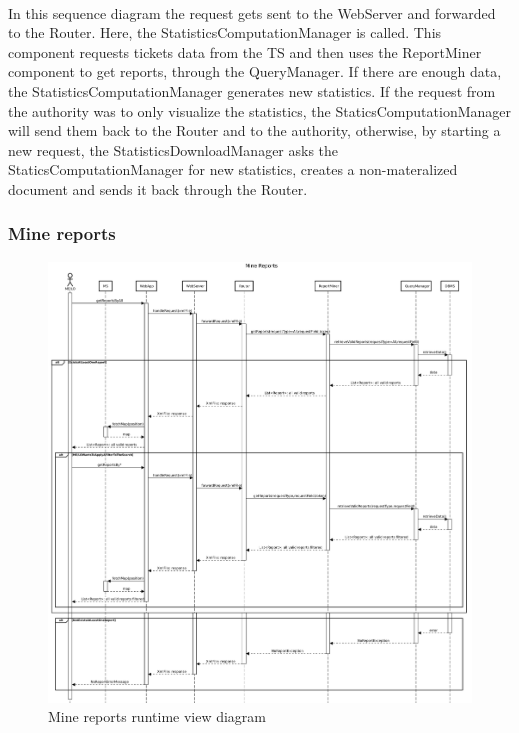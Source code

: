 					\paragraph{}
						In this sequence diagram the request gets sent to the WebServer and forwarded to the Router. Here, the StatisticsComputationManager is called. This component requests tickets data from the TS and then uses the ReportMiner component to get reports, through the QueryManager. If there are enough data, the StatisticsComputationManager generates new statistics. If the request from the authority was to only visualize the statistics, the StaticsComputationManager will send them back to the Router and to the authority, otherwise, by starting a new request, the StatisticsDownloadManager asks the StaticsComputationManager for new statistics, creates a non{-}materalized document and sends it back through the Router.
				\clearpage
				\subsubsection{Mine reports}
					\begin{figure}[!h]
						\centering
						\includegraphics[width=\textwidth]{images/DD2/RuntimeView/Authority/MineReports.pdf}
						\caption{Mine reports runtime view diagram}
					\end{figure}

